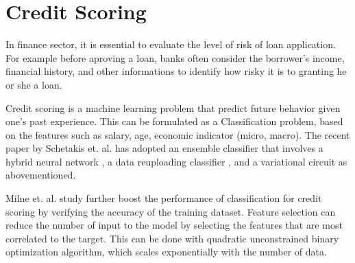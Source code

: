 \section{Credit Scoring}
In finance sector, it is essential to evaluate the level of risk of loan application.
For example before aproving a loan, banks often consider the borrower's income, financial history, and other informations to identify how risky it is to granting he or she a loan.

Credit scoring is a machine learning problem that predict future behavior given one's past experience.
This can be formulated as a Classification problem, based on the features such as salary, age, economic indicator (micro, macro).
The recent paper by Schetakis et. al. \cite{schetakisQuantumMachineLearning2022} has adopted an ensemble classifier that involves a hybrid neural network \cite{farhiClassificationQuantumNeural2018}, a data reuploading classifier \cite{perez-salinasOneQubitUniversal2021}, and a variational circuit as abovementioned.

Milne et. al. \cite{milneOptimalFeatureSelection2017} study further boost the performance of classification for credit scoring by verifying the accuracy of the training dataset.
Feature selection can reduce the number of input to the model by selecting the features that are most correlated to the target.
This can be done with quadratic unconstrained binary optimization algorithm, which scales exponentially with the number of data.